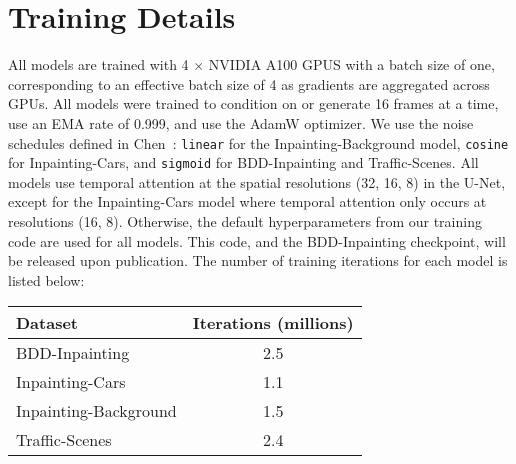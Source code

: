 \chapter{Training Details}

All models are trained with 4 $\times$ NVIDIA A100 GPUS with a batch size of one, corresponding to an effective batch size of 4 as gradients are aggregated across GPUs. 
All models were trained to condition on or generate 16 frames at a time, use an EMA rate of 0.999, and use the AdamW \cite{AdamW} optimizer. We use the noise schedules defined in Chen~\cite{noiseschedules}: \texttt{linear} for the Inpainting-Background model, \texttt{cosine} for Inpainting-Cars, and \texttt{sigmoid} for BDD-Inpainting and Traffic-Scenes. All models use temporal attention at the spatial resolutions (32, 16, 8) in the U-Net, except for the Inpainting-Cars model where temporal attention only occurs at resolutions (16, 8). Otherwise, the default hyperparameters from our training code are used for all models. This code, and the BDD-Inpainting checkpoint, will be released upon publication. The number of training iterations for each model is listed below:
\begin{table}[]
\centering
\begin{tabular}{lc}
\toprule
Dataset               & Iterations (millions) \\ 
\midrule
BDD-Inpainting        & 2.5                   \\
Inpainting-Cars       & 1.1                   \\
Inpainting-Background & 1.5                   \\
Traffic-Scenes        & 2.4                  \\
\bottomrule
\end{tabular}
\end{table}



